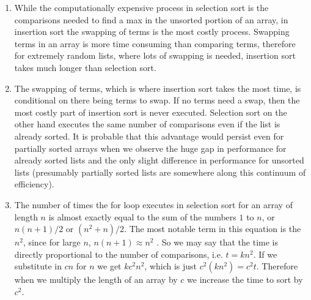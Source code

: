 \documentclass{article}
\title{\sc{Lab 1: Sorting Integers}}
\author{Sam Harder}
\date{}
\begin{document}
	\maketitle 
	\begin{enumerate}
		\item While the computationally expensive process in selection sort is the comparisons needed to find a max in the unsorted portion of an array, in insertion sort the swapping of terms is the most costly process. Swapping terms in an array is more time consuming than comparing terms, therefore for extremely random lists, where lots of swapping is needed, insertion sort takes much longer than selection sort. 
		
		\item The swapping of terms, which is where insertion sort takes the most time, is conditional on there being terms to swap. If no terms need a swap, then the most costly part of insertion sort is never executed. Selection sort on the other hand executes the same number of comparisons even if the list is already sorted. It is probable that this advantage would persist even for partially sorted arrays when we observe the huge gap in performance for already sorted lists and the only slight difference in performance for unsorted lists (presumably partially sorted lists are somewhere along this continuum of efficiency). 
		
		\item The number of times the for loop executes in selection sort for an array of length $n$ is almost exactly equal to the sum of the numbers $1$ to $n$, or $n(n+1)/2$ or $(n^2 + n)/2$. The most notable term in this equation is the $n^2$, since for large $n$, $n(n+1) \approx n^2$ . So we may say that the time is directly proportional to the number of comparisons, i.e. $t = kn^2$.  If we substitute in $cn$ for $n$ we get $kc^2n^2$, which is just $c^2(kn^2) = c^2t$. Therefore when we multiply the length of an array by $c$ we increase the time to sort by $c^2$.  
		

\end{enumerate}
\end{document}
